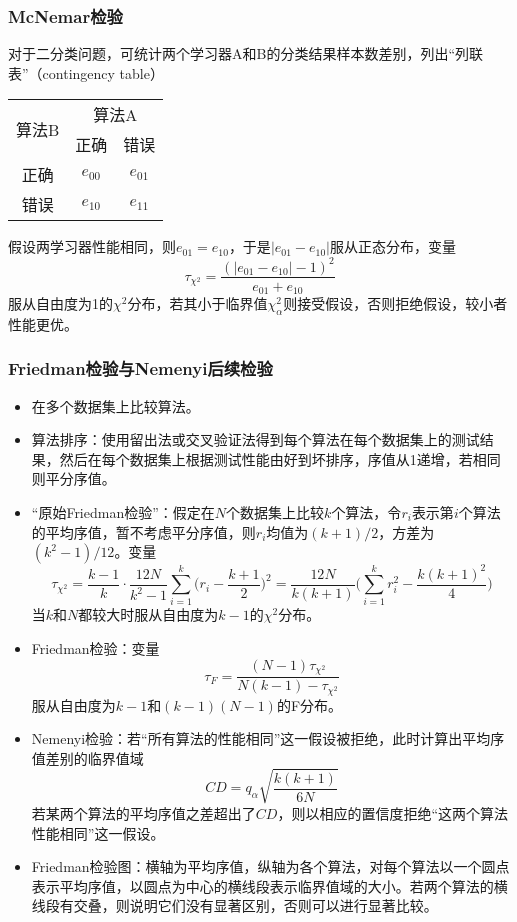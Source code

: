 \documentclass{ctexart}
\begin{document}
					\subsubsection{McNemar检验}
						
						对于二分类问题，可统计两个学习器A和B的分类结果样本数差别，列出``列联表''（contingency table）\begin{center}
							\begin{tabular}{|c|c|c|}
								\hline
								\multirow{2}{*}{算法B} & \multicolumn{2}{c|}{算法A} \\ \cline{2-3} 
								& 正确          & 错误         \\ \hline
								正确                   & $e_{00}$    & $e_{01}$   \\ \hline
								错误                   & $e_{10}$    & $e_{11}$   \\ \hline
							\end{tabular}
						\end{center}
					
						假设两学习器性能相同，则$e_{01}=e_{10}$，于是$|e_{01}-e_{10}|$服从正态分布，变量\[\tau_{\chi^2}=\frac{(|e_{01}-e_{10}|-1)^2}{e_{01}+e_{10}}\]服从自由度为1的$\chi^2$分布，若其小于临界值$\chi_\alpha^2$则接受假设，否则拒绝假设，较小者性能更优。
					\subsubsection{Friedman检验与Nemenyi后续检验}
						\begin{itemize}
							\item 在多个数据集上比较算法。
							\item 算法排序：使用留出法或交叉验证法得到每个算法在每个数据集上的测试结果，然后在每个数据集上根据测试性能由好到坏排序，序值从1递增，若相同则平分序值。
							\item ``原始Friedman检验''：假定在$N$个数据集上比较$k$个算法，令$r_i$表示第$i$个算法的平均序值，暂不考虑平分序值，则$r_i$均值为$(k+1)/2$，方差为$(k^2-1)/12$。变量\[\tau_{\chi^2}=\frac{k-1}{k}\cdot\frac{12N}{k^2-1}\sum_{i=1}^{k}\big(r_i-\frac{k+1}{2}\big)^2=\frac{12N}{k(k+1)}\bigg(\sum_{i=1}^{k}r_i^2-\frac{k(k+1)^2}{4}\bigg)\]当$k$和$N$都较大时服从自由度为$k-1$的$\chi^2$分布。
							\item Friedman检验：变量\[\tau_F=\frac{(N-1)\tau_{\chi^2}}{N(k-1)-\tau_{\chi^2}}\]服从自由度为$k-1$和$(k-1)(N-1)$的F分布。
							\item Nemenyi检验：若``所有算法的性能相同''这一假设被拒绝，此时计算出平均序值差别的临界值域\[CD=q_{\alpha}\sqrt{\frac{k(k+1)}{6N}}\]若某两个算法的平均序值之差超出了$CD$，则以相应的置信度拒绝``这两个算法性能相同''这一假设。
							\item Friedman检验图：横轴为平均序值，纵轴为各个算法，对每个算法以一个圆点表示平均序值，以圆点为中心的横线段表示临界值域的大小。若两个算法的横线段有交叠，则说明它们没有显著区别，否则可以进行显著比较。
						\end{itemize}
\end{document}
